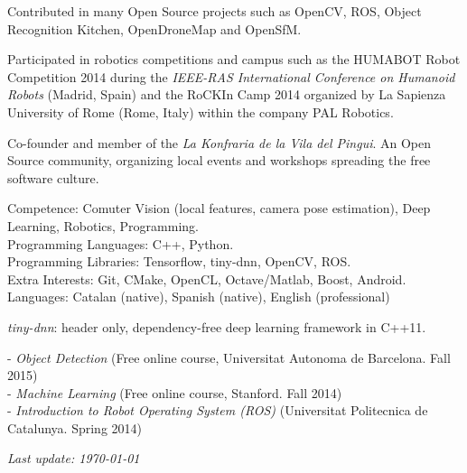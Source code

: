 \documentclass{article}
\begin{document}
\begin{llist}
Contributed in many Open Source projects such as OpenCV, ROS, Object Recognition Kitchen, OpenDroneMap and OpenSfM.

Participated in robotics competitions and campus such as the HUMABOT Robot Competition 2014 during the \textit{IEEE-RAS International Conference on Humanoid Robots} (Madrid, Spain) and the RoCKIn Camp 2014 organized by  La Sapienza University of Rome (Rome, Italy) within the company PAL Robotics.

Co-founder and member of the \textit{La Konfraria de la Vila del Pingui}. An Open Source community, organizing local events and workshops spreading the free software culture.


\label{Skills}
Competence: Comuter Vision (local features, camera pose estimation), Deep Learning, Robotics, Programming.\\
Programming Languages: C++, Python.\\
Programming Libraries: Tensorflow, tiny-dnn, OpenCV, ROS. \\
Extra Interests: Git, CMake, OpenCL, Octave/Matlab, Boost, Android. \\
Languages: Catalan (native), Spanish (native), English  (professional)


{\em tiny-dnn}: header only, dependency-free deep learning framework in C++11.


%



\label{Relevant Coursework}
- \textit{Object Detection} (Free online course, Universitat Autonoma de Barcelona. Fall 2015)\\
- \textit{Machine Learning} (Free online course, Stanford. Fall 2014)\\
- \textit{Introduction to Robot Operating System (ROS)} (Universitat Politecnica de Catalunya. Spring 2014)

\label{Reference}


\end{llist}

{\em Last update: \today}
\end{document}
